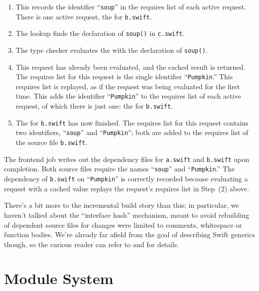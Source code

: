 \documentclass[../generics]{subfiles}
\begin{document}
\begin{example}
\begin{enumerate}
\item This records the identifier ``\texttt{soup}'' in the requires list of each active request. There is one active request, the  for \texttt{b.swift}.
\item The lookup finds the declaration of \texttt{soup()} in \texttt{c.swift}.
\item The type checker evaluates the  with the declaration of \texttt{soup()}.
\item This request has already been evaluated, and the cached result is returned. The requires list for this request is the single identifier ``\texttt{Pumpkin}.'' This requires list is replayed, as if the request was being evaluated for the first time. This adds the identifier ``\texttt{Pumpkin}'' to the requires list of each active request, of which there is just one: the  for \texttt{b.swift}.
\item The  for \texttt{b.swift} has now finished. The requires list for this request contains two identifiers, ``\texttt{soup}'' and ``\texttt{Pumpkin}''; both are added to the requires list of the source file \texttt{b.swift}.
\end{enumerate}

The frontend job writes out the dependency files for \texttt{a.swift} and \texttt{b.swift} upon completion. Both source files require the names ``\texttt{soup}'' and ``\texttt{Pumpkin}.'' The dependency of \texttt{b.swift} on ``\texttt{Pumpkin}'' is correctly recorded because evaluating a request with a cached value replays the request's requires list in Step~(2) above.
\end{example}

There's a bit more to the incremental build story than this; in particular, we haven't talked about the ``interface hash'' mechanism, meant to avoid rebuilding of dependent source files for changes were limited to comments, whitespace or function bodies. We're already far afield from the goal of describing Swift generics though, so the curious reader can refer to \cite{reqeval} and \cite{incremental} for details.

\section{Module System}\label{module system}
\end{document}
